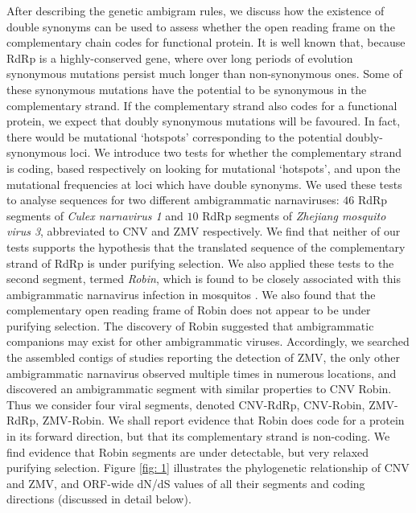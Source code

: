 \documentclass[unnumsec,webpdf,contemporary,large,namedate]{oup-authoring-template}%
\theoremstyle{thmstyleone}%
\theoremstyle{thmstyletwo}%
\theoremstyle{thmstylethree}%
\begin{document}
After describing the genetic ambigram rules, we discuss how the existence of double synonyms
can be used to assess whether the open reading frame on the complementary chain codes for
functional protein. It is well known that, because RdRp is a highly-conserved gene, where over long periods of evolution synonymous
mutations persist much longer than non-synonymous ones. Some of these synonymous
mutations have the potential to be synonymous in the complementary strand. If the complementary
strand also codes for a functional protein, we expect that doubly synonymous mutations will be
favoured. In fact, there would be mutational \lq hotspots' corresponding to the potential
doubly-synonymous loci. We introduce two tests for whether the complementary strand
is coding, based respectively on looking for mutational \lq hotspots', and upon the mutational
frequencies at loci which have double synonyms. We used these tests to analyse sequences for
two different ambigrammatic narnaviruses: $46$ RdRp segments of \emph{Culex narnavirus 1} and
$10$ RdRp segments of \emph{Zhejiang mosquito virus 3}, abbreviated to CNV and ZMV respectively.
We find that neither of our tests supports the hypothesis
that the translated sequence of the complementary strand of RdRp
is under purifying selection. We also applied these tests to the second segment,
termed \emph{Robin}, which is found to be closely associated with this
ambigrammatic narnavirus infection in mosquitos \citep{Bat+20,Ret+20}. We also found that the
complementary open reading frame of Robin does not appear to be under purifying selection.
The discovery of Robin suggested that ambigrammatic companions may exist for
other ambigrammatic viruses. Accordingly, we searched the assembled contigs of studies reporting the detection of ZMV, the only other ambigrammatic narnavirus observed multiple times in numerous locations,
and discovered an ambigrammatic segment with similar properties to CNV Robin.
Thus we consider four viral segments, denoted CNV-RdRp, CNV-Robin, ZMV-RdRp, ZMV-Robin.
We shall report evidence that Robin does code for a protein in its forward direction, but that its
complementary strand is non-coding. We find evidence that Robin segments are under detectable, but very relaxed purifying selection.
Figure \ref{fig: 1} illustrates the phylogenetic relationship of CNV and ZMV, and ORF-wide dN/dS values of all their segments and coding directions (discussed in detail below).
\end{document}
